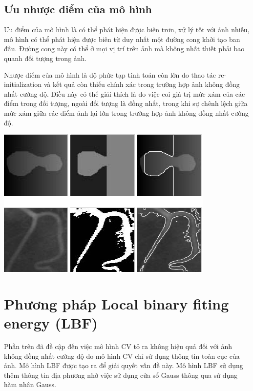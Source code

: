 \documentclass[12pt,oneside,a4]{report}
\begin{document}
\subsection{Ưu nhược điểm của mô hình}
\hspace{0.5cm}Ưu điểm của mô hình là có thể phát hiện được biên trơn, xử lý tốt với ảnh nhiễu, mô hình có thể phát hiện được biên từ duy nhất một đường cong khởi tạo ban đầu. Đường cong này có thể ở mọi vị trí trên ảnh mà không nhất thiết phải bao quanh đối tượng trong ảnh.

Nhược điểm của mô hình  là độ phức tạp tính toán còn lớn do thao tác re-initialization và kết quả còn thiếu chính xác trong trường hợp ảnh không đồng nhất cường độ. Điều này có thể giải thích là do việc coi giá trị mức xám của các điểm trong đối tượng, ngoài đối tượng là đồng nhất, trong khi sự chênh lệch giữa mức xám giữa các điểm ảnh lại lớn trong trường hợp ảnh không đồng nhất cường độ.

\begin{center}
\includegraphics[]{figure/mistake.png}
\end{center}

\section{Phương pháp Local binary fiting energy (LBF)}
Phần trên đã đề cập đến việc mô hình CV tỏ ra không hiệu quả đối với ảnh không đồng nhất cường độ do mô hình CV chỉ sử dụng thông tin toàn cục của ảnh. Mô hình LBF được tạo ra để giải quyết vấn đề này. Mô hình LBF sử dụng thêm thông tin địa phương nhờ việc sử dụng cửa sổ Gauss thông qua sử dụng hàm nhân Gauss.
\end{document}
